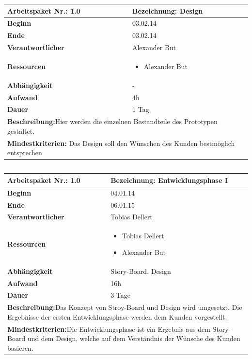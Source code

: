 \documentclass[fontsize=12pt,paper=a4,twoside]{scrartcl}
\begin{document}
\begin{tabular}{|p{5.3cm}|p{9.7cm}|}\hline
	\textbf{Arbeitspaket Nr.:} 1.0 & \textbf{Bezeichnung:} Design\\ \hline \hline
	\textbf{Beginn} & 03.02.14\\ \hline
	\textbf{Ende} & 03.02.14\\ \hline
	\textbf{Verantwortlicher} & Alexander But\\ \hline
	\textbf{Ressourcen} & \begin{itemize}
		\item Alexander But
	\end{itemize}    \\ \hline
	\textbf{Abhängigkeit} & -\\ \hline
	\textbf{Aufwand} & 4h\\ \hline
	\textbf{Dauer} & 1 Tag\\ \hline
	\multicolumn{2}{|p{15cm}|}{\textbf{Beschreibung:}Hier werden die einzelnen Bestandteile des Prototypen gestaltet.\newline   }\\ \hline
	\multicolumn{2}{|p{15cm}|}{\textbf{Mindestkriterien:} Das Design soll den Wünschen des Kunden bestmöglich entsprechen\newline }\\ \hline
	
\end{tabular}
\begin{verbatim} 

\end{verbatim}
\begin{tabular}{|p{5.3cm}|p{9.7cm}|}\hline
	\textbf{Arbeitspaket Nr.:} 1.0 & \textbf{Bezeichnung:} Entwicklungsphase I \\ \hline \hline
	\textbf{Beginn} & 04.01.14\\ \hline
	\textbf{Ende} & 06.01.15\\ \hline
	\textbf{Verantwortlicher} & Tobias Dellert \\ \hline
	\textbf{Ressourcen} & \begin{itemize}
		\item Tobias Dellert
		\item Alexander But
	\end{itemize}    \\ \hline
	\textbf{Abhängigkeit} & Story-Board, Design\\ \hline
	\textbf{Aufwand} & 16h\\ \hline
	\textbf{Dauer} & 3 Tage\\ \hline
	\multicolumn{2}{|p{15cm}|}{\textbf{Beschreibung:}\newline Das Konzept von Stroy-Board und Design wird umgesetzt. Die Ergebnisse der ersten Entwicklungsphase werden dem Kunden vorgestellt.  }\\ \hline
	\multicolumn{2}{|p{15cm}|}{\textbf{Mindestkriterien:}\newline Die Entwicklungsphase ist ein Ergebnis aus dem Story-Board und dem Design, welche auf dem Verständnis der Wünsche des Kunden basieren.}\\ \hline
	
\end{tabular}
\end{document}
